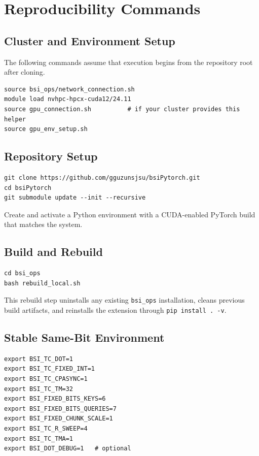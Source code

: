 \chapter{Reproducibility Commands}

\section{Cluster and Environment Setup}
The following commands assume that execution begins from the repository root after cloning.

\begin{verbatim}
source bsi_ops/network_connection.sh
module load nvhpc-hpcx-cuda12/24.11
source gpu_connection.sh          # if your cluster provides this helper
source gpu_env_setup.sh
\end{verbatim}

\section{Repository Setup}
\begin{verbatim}
git clone https://github.com/gguzunsjsu/bsiPytorch.git
cd bsiPytorch
git submodule update --init --recursive
\end{verbatim}

Create and activate a Python environment with a CUDA-enabled PyTorch build that matches the system.

\section{Build and Rebuild}
\begin{verbatim}
cd bsi_ops
bash rebuild_local.sh
\end{verbatim}

This rebuild step uninstalls any existing \texttt{bsi\_ops} installation, cleans previous build artifacts, and reinstalls the extension through \texttt{pip install . -v}.

\section{Stable Same-Bit Environment}
\begin{verbatim}
export BSI_TC_DOT=1
export BSI_TC_FIXED_INT=1
export BSI_TC_CPASYNC=1
export BSI_TC_TM=32
export BSI_FIXED_BITS_KEYS=6
export BSI_FIXED_BITS_QUERIES=7
export BSI_FIXED_CHUNK_SCALE=1
export BSI_TC_R_SWEEP=4
export BSI_TC_TMA=1
export BSI_DOT_DEBUG=1   # optional
\end{verbatim}

